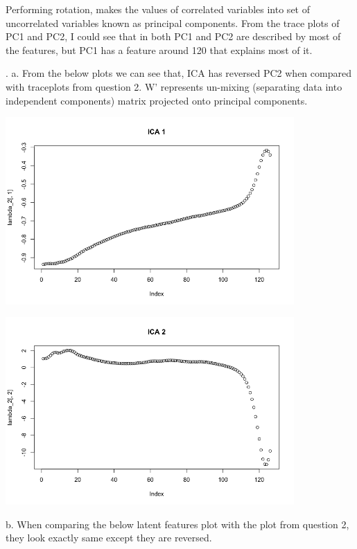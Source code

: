 \documentclass[a4paper,10pt]{article}
\begin{document}
Performing rotation, makes the values of correlated variables into set of uncorrelated variables known as principal components.
From the trace plots of PC1 and PC2, I could see that in both PC1 and PC2 are described by most of the features, but PC1 has a feature around 120 that explains most of it. \par
{}. a. From the below plots we can see that, ICA has reversed PC2 when compared with traceplots from question 2. W' represents un-mixing (separating data into independent components) matrix
projected onto principal components. \par
\begin{center}
  \includegraphics[width=110mm,scale=0.10]{Latent_Features_1_Traceplot.png} \par
  \includegraphics[width=110mm,scale=0.10]{Latent_Features_2_Traceplot.png}
\end{center} \par
\newpage
b. When comparing the below latent features plot with the plot from question 2, they look exactly same except they are reversed.
\end{document}
